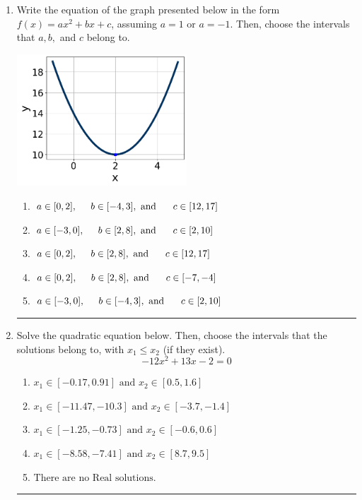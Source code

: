 \documentclass[14pt]{extbook}
\newcommand{\litem}[1]{\item#1\hspace*{-1cm}\rule{\textwidth}{0.4pt}}
\begin{document}
\begin{enumerate}
\litem{
Write the equation of the graph presented below in the form $f(x)=ax^2+bx+c$, assuming  $a=1$ or $a=-1$. Then, choose the intervals that $a, b,$ and $c$ belong to.
\begin{center}
    \includegraphics[width=0.5\textwidth]{../Figures/quadraticGraphToEquationA.png}
\end{center}
\begin{enumerate}[label=\Alph*.]
\item \( a \in [0, 2], \hspace*{5mm} b \in [-4, 3], \text{ and } \hspace*{5mm} c \in [12, 17] \)
\item \( a \in [-3, 0], \hspace*{5mm} b \in [2, 8], \text{ and } \hspace*{5mm} c \in [2, 10] \)
\item \( a \in [0, 2], \hspace*{5mm} b \in [2, 8], \text{ and } \hspace*{5mm} c \in [12, 17] \)
\item \( a \in [0, 2], \hspace*{5mm} b \in [2, 8], \text{ and } \hspace*{5mm} c \in [-7, -4] \)
\item \( a \in [-3, 0], \hspace*{5mm} b \in [-4, 3], \text{ and } \hspace*{5mm} c \in [2, 10] \)

\end{enumerate} }
\litem{
Solve the quadratic equation below. Then, choose the intervals that the solutions belong to, with $x_1 \leq x_2$ (if they exist).\[ -12x^{2} +13 x -2 = 0 \]\begin{enumerate}[label=\Alph*.]
\item \( x_1 \in [-0.17, 0.91] \text{ and } x_2 \in [0.5, 1.6] \)
\item \( x_1 \in [-11.47, -10.3] \text{ and } x_2 \in [-3.7, -1.4] \)
\item \( x_1 \in [-1.25, -0.73] \text{ and } x_2 \in [-0.6, 0.6] \)
\item \( x_1 \in [-8.58, -7.41] \text{ and } x_2 \in [8.7, 9.5] \)
\item \( \text{There are no Real solutions.} \)


\end{enumerate}}
\end{enumerate}
\end{document}
